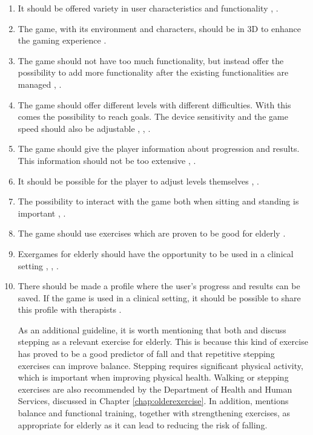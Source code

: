\begin{enumerate}[{g}.1]
\item It should be offered variety in user characteristics and functionality \cite{gregor}, \cite{gerling1}.
\item The game, with its environment and characters, should be in 3D to enhance the gaming experience \cite{john2012smartsenior}.
\item The game should not have too much functionality, but instead offer the possibility to add more functionality after the existing functionalities are managed \cite{gregor}, \cite{gerling2}.
\item The game should offer different levels with different difficulties. With this comes the possibility to reach goals. The device sensitivity and the game speed should also be adjustable \cite{gregor}, \cite{gerling1}, \cite{john2012smartsenior}.
\item The game should give the player information about progression and results. This information should not be too extensive \cite{exergamesforelderly}, \cite{john2012smartsenior}.
\item It should be possible for the player to adjust levels themselves \cite{gregor}, \cite{gerling1}. 
\item The possibility to interact with the game both when sitting and standing is important \cite{gerling1}, \cite{gerling2}.
\item The game should use exercises which are proven to be good for elderly \cite{john2012smartsenior}. 
\item Exergames for elderly should have the opportunity to be used in a clinical setting \cite{Billis}, \cite{gerling2}, \cite{john2012smartsenior}.
\item There should be made a profile where the user's progress and results can be saved. If the game is used in a clinical setting, it should be possible to share this profile with therapists \cite{john2012smartsenior}. 

As an additional guideline, it is worth mentioning that both \cite{bruin} and \cite{gerling2} discuss stepping as a relevant exercise for elderly. This is because this kind of exercise has proved to be a good predictor of fall and that repetitive stepping exercises can improve balance. Stepping requires significant physical activity, which is important when improving physical health. Walking or stepping exercises are also recommended by the Department of Health and Human Services, discussed in Chapter \ref{chap:olderexercise}. In addition, \cite{john2012smartsenior} mentions balance and functional training, together with strengthening exercises, as appropriate for elderly as it can lead to reducing the risk of falling.    


\end{enumerate}
